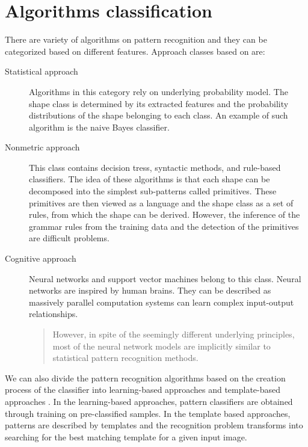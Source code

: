 \section{Algorithms classification}
There are variety of algorithms on pattern recognition and they can be categorized based on different features. Approach classes based on \citet{imageRecognition}  are:
\begin{description}
\item [Statistical approach] Algorithms in this category rely  on  underlying probability model. The shape class is determined by its extracted features  and the probability distributions of the shape belonging to each class. An example of such algorithm is the naive Bayes classifier.

\item [Nonmetric approach] This class contains decision tress, syntactic methods, and rule-based classifiers. The idea of these algorithms is that each shape can be decomposed into the simplest sub-patterns called primitives. These primitives are then viewed as a language and the shape class as a set of rules, from which the shape can be derived. However, the inference of the grammar rules from the training data and the detection of the primitives are difficult problems.

\item [Cognitive approach] Neural networks and support vector machines belong to this class. Neural networks are inspired by human brains. They can be described as massively parallel computation systems  can learn complex input-output relationships.

\begin{quotation} However, in spite of the seemingly different underlying principles, most of the neural network models are implicitly similar to statistical pattern recognition methods. \end{quotation} %

\end{description}

We can also divide the pattern recognition algorithms based on the creation process of the classifier into learning-based approaches and template-based approaches \cite{skeletonMatching}. In the learning-based approaches, pattern classifiers are obtained through training on pre-classified samples. In the template based approaches, patterns are described by templates and the recognition problem transforms  into searching for the best matching template for a given input image.


